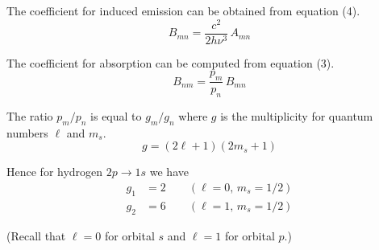 \documentclass[12pt]{article}
\newcommand\BNM{B_{nm}} %
\newcommand\BMN{B_{mn}} %
\newcommand\AMN{A_{mn}} %
\begin{document}
\noindent
The coefficient for induced emission can be obtained from equation (4).
\begin{equation*}
\BMN=\frac{c^2}{2h\nu^3}\,\AMN
\end{equation*}

\noindent
The coefficient for absorption can be computed from equation (3).
\begin{equation*}
\BNM=\frac{p_m}{p_n}\,\BMN
\end{equation*}

\noindent
The ratio $p_m/p_n$ is equal to $g_m/g_n$ where $g$ is the multiplicity
for quantum numbers $\ell$ and $m_s$.
\begin{equation*}
g=(2\ell+1)(2m_s+1)
\end{equation*}

\noindent
Hence for hydrogen $2p\rightarrow1s$ we have
\begin{align*}
g_1&=2\qquad(\ell=0,\,m_s=1/2)
\\
g_2&=6\qquad(\ell=1,\,m_s=1/2)
\end{align*}

\noindent
(Recall that $\ell=0$ for orbital $s$ and $\ell=1$ for orbital $p$.)
\end{document}
